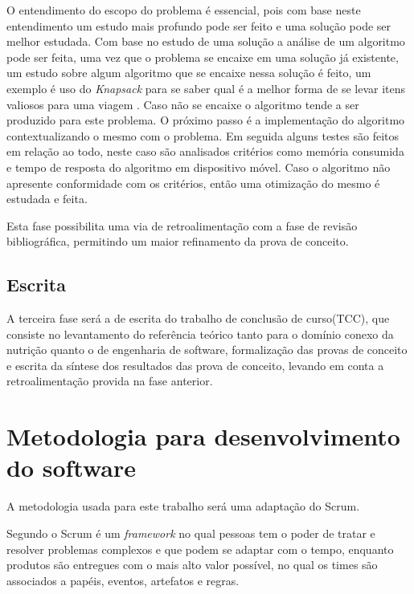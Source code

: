 O entendimento do escopo do problema é essencial, pois com base neste entendimento um estudo mais profundo pode ser feito e uma solução pode ser melhor estudada. 
Com base no estudo de uma solução a análise de um algoritmo pode ser feita, uma vez que o problema se encaixe em uma solução já existente, um estudo sobre algum algoritmo que se encaixe nessa solução é feito, um exemplo é uso do \textit{Knapsack} para se saber qual é a melhor forma de se levar itens valiosos para uma viagem \cite{book_algorithm_design}. Caso não se encaixe o algoritmo tende a ser produzido para este problema. 
O próximo passo é a implementação do algoritmo contextualizando o mesmo com o problema.
Em seguida alguns testes são feitos em relação ao todo, neste caso são analisados critérios como memória consumida e tempo de resposta do algoritmo em dispositivo móvel. Caso o algoritmo não apresente conformidade com os critérios, então uma otimização do mesmo é estudada e feita. %

Esta fase possibilita uma via de retroalimentação com a fase de
revisão bibliográfica, permitindo um maior refinamento da prova de
conceito.

\subsection{Escrita}
A terceira fase será a de escrita do trabalho de conclusão de curso(TCC), que
consiste no levantamento do referência teórico tanto para o domínio conexo da nutrição quanto o de engenharia de software, formalização das provas de conceito e escrita da síntese dos resultados das prova de conceito, 
levando em conta a retroalimentação provida na fase anterior.

\section{Metodologia para desenvolvimento do software}


	A metodologia usada para este trabalho será uma adaptação do Scrum. 

	Segundo \cite{scrum} o Scrum é um \textit{framework} no qual pessoas tem o poder de tratar e resolver problemas complexos e que podem se adaptar com o tempo, enquanto produtos são entregues com o mais alto valor possível, no qual os times são associados a papéis, eventos, artefatos e regras.

